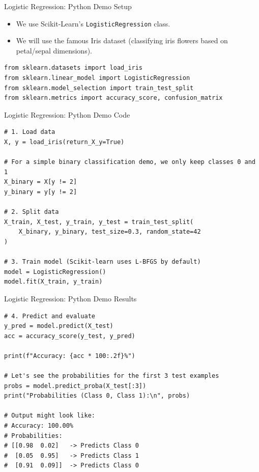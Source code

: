 \documentclass[aspectratio=169]{beamer}
\begin{document}
\begin{frame}[fragile]{Logistic Regression: Python Demo Setup}
\begin{itemize}
    \item We use Scikit-Learn's \texttt{LogisticRegression} class.
    \item We will use the famous Iris dataset (classifying iris flowers based on petal/sepal dimensions).
\end{itemize}
\begin{verbatim}
from sklearn.datasets import load_iris
from sklearn.linear_model import LogisticRegression
from sklearn.model_selection import train_test_split
from sklearn.metrics import accuracy_score, confusion_matrix
\end{verbatim}
\end{frame}

\begin{frame}[fragile]{Logistic Regression: Python Demo Code}
\begin{verbatim}
# 1. Load data
X, y = load_iris(return_X_y=True)

# For a simple binary classification demo, we only keep classes 0 and 1
X_binary = X[y != 2]
y_binary = y[y != 2]

# 2. Split data
X_train, X_test, y_train, y_test = train_test_split(
    X_binary, y_binary, test_size=0.3, random_state=42
)

# 3. Train model (Scikit-learn uses L-BFGS by default)
model = LogisticRegression()
model.fit(X_train, y_train)
\end{verbatim}
\end{frame}

\begin{frame}[fragile]{Logistic Regression: Python Demo Results}
\begin{verbatim}
# 4. Predict and evaluate
y_pred = model.predict(X_test)
acc = accuracy_score(y_test, y_pred)

print(f"Accuracy: {acc * 100:.2f}%")

# Let's see the probabilities for the first 3 test examples
probs = model.predict_proba(X_test[:3])
print("Probabilities (Class 0, Class 1):\n", probs)

# Output might look like:
# Accuracy: 100.00%
# Probabilities:
# [[0.98  0.02]   -> Predicts Class 0
#  [0.05  0.95]   -> Predicts Class 1
#  [0.91  0.09]]  -> Predicts Class 0
\end{verbatim}
\end{frame}
\end{document}
